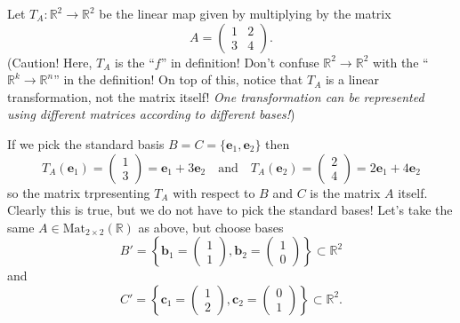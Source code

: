 \documentclass[12pt]{report}
\theoremstyle{definition}
\begin{document}
\begin{ex}\label{ex:matrix-representing-f}
    Let $T_A:\mathbb{R}^{2}\rightarrow\mathbb{R}^{2}$ be the linear map
    given by multiplying by the matrix\[
        A=\begin{pmatrix}
            1 & 2 \\
            3 & 4
        \end{pmatrix}.
    \]
    (Caution! Here, $T_A$ is the ``$f$'' in definition!
    Don't confuse $\mathbb{R}^{2}\rightarrow\mathbb{R}^{2}$
    with the ``$\mathbb{R}^{k}\rightarrow\mathbb{R}^{n}$'' in the definition!
    On top of this, notice that $T_A$ is a linear transformation,
    not the matrix itself! \emph{One transformation can be represented
    using different matrices according to different bases!})

    \medskip
    \noindent If we pick the standard basis $B=C=\{\mathbf{e}_1,\mathbf{e}_2\}$ then\[
    T_A(\mathbf{e}_1)=\begin{pmatrix}
            1 \\
            3
    \end{pmatrix} = \mathbf{e}_1 + 3\mathbf{e}_2
    \quad\text{and}\quad
    T_A(\mathbf{e}_2) = \begin{pmatrix}
            2 \\
            4
    \end{pmatrix} = 2\mathbf{e}_1 + 4\mathbf{e}_2
    \]
    so the matrix trpresenting $T_A$ with respect to $B$ and $C$ is
    the matrix $A$ itself. Clearly this is true, but we do not have to
    pick the standard bases! Let's take the same 
    $A\in\text{Mat}_{2\times 2}(\mathbb{R})$ as above, but choose bases\[
        B'=\left\{\mathbf{b}_1 = \begin{pmatrix}
                1 \\
                1
        \end{pmatrix}, \mathbf{b}_2 = \begin{pmatrix}
                1 \\
                0
        \end{pmatrix} \right\} \subset\mathbb{R}^{2}
    \]and\[
        C'=\left\{\mathbf{c}_1 = \begin{pmatrix}
                1 \\
                2
        \end{pmatrix}, \mathbf{c}_2 = \begin{pmatrix}
                0 \\
                1
        \end{pmatrix} \right\} \subset\mathbb{R}^{2}.
\]
\end{ex}
\end{document}
